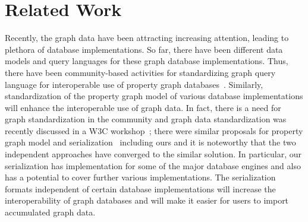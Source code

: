 \documentclass[runningheads]{llncs}
\begin{document}
\section{Related Work}
Recently, the graph data have been attracting increasing attention, leading to plethora of database implementations. 
So far, there have been different data models and query languages for these graph database implementations.
Thus, there have been community-based activities for standardizing graph query language for interoperable use of property graph databases~\cite{angles3}. Similarly, standardization of the property graph model of various database implementations will enhance the interoperable use of graph data. In fact, there is a need for graph standardization in the community and graph data standardization was recently discussed in a W3C workshop~\cite{w3c}; there were similar proposals for property graph model and serialization~\cite{tomaszuk} including ours and it is noteworthy that the two independent approaches have converged to the similar solution. 
In particular, our serialization has implementation for some of the major database engines and also has a potential to cover further various implementations. %
The serialization formats independent of certain database implementations will increase the interoperability of graph databases and will make it easier for users to import accumulated graph data.
\end{document}
